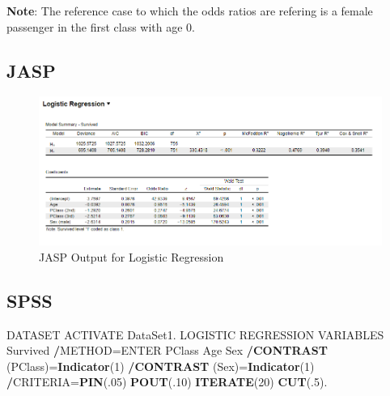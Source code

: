\documentclass[
]{book}
\newenvironment{Shaded}{\begin{snugshade}}{\end{snugshade}}
\newcommand{\DecValTok}[1]{\textcolor[rgb]{0.00,0.00,0.81}{#1}}
\newcommand{\KeywordTok}[1]{\textcolor[rgb]{0.13,0.29,0.53}{\textbf{#1}}}
\newcommand{\NormalTok}[1]{#1}
\newcommand{\OperatorTok}[1]{\textcolor[rgb]{0.81,0.36,0.00}{\textbf{#1}}}
\begin{document}
\textbf{Note}: The reference case to which the odds ratios are refering is a female passenger in the first class with age 0.

\hypertarget{jasp-2}{%
\subsection{JASP}\label{jasp-2}}

\begin{figure}[!h]
\includegraphics{Screenshots/Logistic Regression/LogRegJASP} \caption{\label{fig:LogRegJASP}JASP Output for Logistic Regression}\label{fig:LogRegJASP}
\end{figure}

\hypertarget{spss-2}{%
\subsection{SPSS}\label{spss-2}}

\begin{Shaded}
\begin{Highlighting}[]
\NormalTok{DATASET ACTIVATE DataSet1.}
\NormalTok{LOGISTIC REGRESSION VARIABLES Survived}
  \OperatorTok{/}\NormalTok{METHOD=ENTER PClass Age Sex }
  \OperatorTok{/}\KeywordTok{CONTRAST}\NormalTok{ (PClass)=}\KeywordTok{Indicator}\NormalTok{(}\DecValTok{1}\NormalTok{)}
  \OperatorTok{/}\KeywordTok{CONTRAST}\NormalTok{ (Sex)=}\KeywordTok{Indicator}\NormalTok{(}\DecValTok{1}\NormalTok{)}
  \OperatorTok{/}\NormalTok{CRITERIA=}\KeywordTok{PIN}\NormalTok{(.}\DecValTok{05}\NormalTok{) }\KeywordTok{POUT}\NormalTok{(.}\DecValTok{10}\NormalTok{) }\KeywordTok{ITERATE}\NormalTok{(}\DecValTok{20}\NormalTok{) }\KeywordTok{CUT}\NormalTok{(.}\DecValTok{5}\NormalTok{).}
\end{Highlighting}
\end{Shaded}
\end{document}
